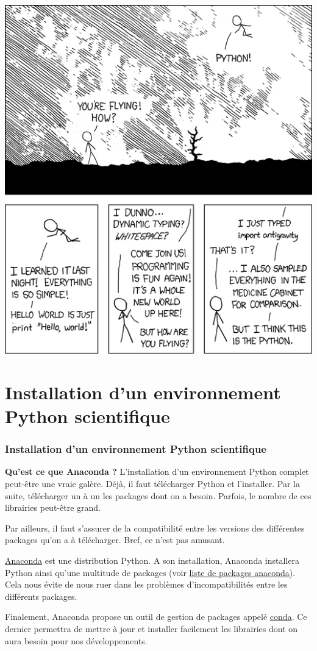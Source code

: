 \documentclass{beamer}
\begin{document}
\begin{frame}

\vspace{6mm}

\centerline{\includegraphics[width=0.6\linewidth]{figs/python_easy.png}}

\vspace{6mm}
\end{frame}

\section{Installation d'un environnement Python scientifique}

\begin{frame}
\frametitle{Installation d'un environnement Python scientifique}




\noindent\textbf{Qu’est ce que Anaconda ?}
L’installation d’un environnement Python complet peut-être une vraie galère. Déjà, il faut télécharger Python et l’installer. Par la suite, télécharger un à un les packages dont on a besoin. Parfois, le nombre de ces librairies peut-être grand.

Par ailleurs, il faut s’assurer de la compatibilité entre les versions des différentes packages qu’on a à télécharger. Bref, ce n’est pas amusant.


\end{frame}

\begin{frame}

\href{{https://www.anaconda.com/download/}}{Anaconda} est  une distribution Python. A son installation, Anaconda installera Python ainsi qu'une multitude de packages (voir \href{{https://docs.anaconda.com/anaconda/packages/pkg-docs#python-3-6}}{liste de packages anaconda}).  Cela nous évite de nous ruer dans les problèmes d’incompatibilités entre les différents packages.

Finalement, Anaconda propose un outil de gestion de packages appelé \href{{https://conda.io/docs/}}{conda}. Ce dernier permettra de mettre à jour et installer facilement les librairies dont on aura besoin pour nos développements.
\end{frame}
\end{document}
